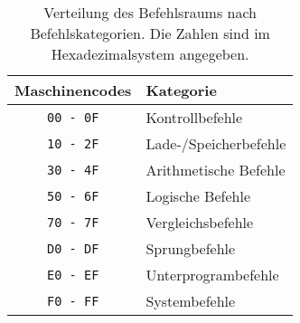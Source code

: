 \begin{table}
  \centering
  \begin{tabular}{|c|l|}                        \hline
    Maschinencodes   & Kategorie              \\\hline\hline
    \texttt{00 - 0F} & Kontrollbefehle        \\
    \texttt{10 - 2F} & Lade-/Speicherbefehle  \\
    \texttt{30 - 4F} & Arithmetische Befehle  \\
    \texttt{50 - 6F} & Logische Befehle       \\
    \texttt{70 - 7F} & Vergleichsbefehle      \\
    \texttt{D0 - DF} & Sprungbefehle          \\
    \texttt{E0 - EF} & Unterprogrambefehle    \\
    \texttt{F0 - FF} & Systembefehle          \\\hline
  \end{tabular}
  \caption[Verteilung des Befehlsraums]
          {Verteilung des Befehlsraums nach Befehlskategorien.
          Die Zahlen sind im Hexadezimalsystem angegeben.}
  \label{tab:Befehlraumverteilung}
\end{table}


